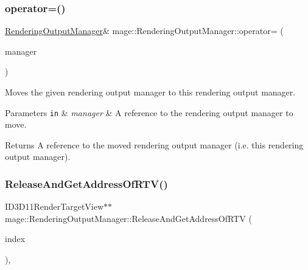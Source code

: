 \subsubsection{\texorpdfstring{operator=()}{operator=()}\hspace{0.1cm}{\footnotesize\ttfamily [2/2]}}
{\footnotesize\ttfamily \hyperlink{classmage_1_1_rendering_output_manager}{Rendering\+Output\+Manager}\& mage\+::\+Rendering\+Output\+Manager\+::operator= (\begin{DoxyParamCaption}\item[{\hyperlink{classmage_1_1_rendering_output_manager}{Rendering\+Output\+Manager} \&\&}]{manager }\end{DoxyParamCaption})\hspace{0.3cm}{\ttfamily [delete]}}

Moves the given rendering output manager to this rendering output manager.


\begin{DoxyParams}[1]{Parameters}
\mbox{\tt in}  & {\em manager} & A reference to the rendering output manager to move. \\
\hline
\end{DoxyParams}
\begin{DoxyReturn}{Returns}
A reference to the moved rendering output manager (i.\+e. this rendering output manager). 
\end{DoxyReturn}
\hypertarget{classmage_1_1_rendering_output_manager_a1b8102ba96cdab743499da051ca4fa3f}{}\label{classmage_1_1_rendering_output_manager_a1b8102ba96cdab743499da051ca4fa3f} 
\subsubsection{\texorpdfstring{Release\+And\+Get\+Address\+Of\+R\+T\+V()}{ReleaseAndGetAddressOfRTV()}}
{\footnotesize\ttfamily I\+D3\+D11\+Render\+Target\+View$\ast$$\ast$ mage\+::\+Rendering\+Output\+Manager\+::\+Release\+And\+Get\+Address\+Of\+R\+TV (\begin{DoxyParamCaption}\item[{\hyperlink{classmage_1_1_rendering_output_manager_aebe136819797593f0fcf53b753e9c3ce}{R\+T\+V\+Index}}]{index }\end{DoxyParamCaption})\hspace{0.3cm}{\ttfamily [private]}, {\ttfamily [noexcept]}}

